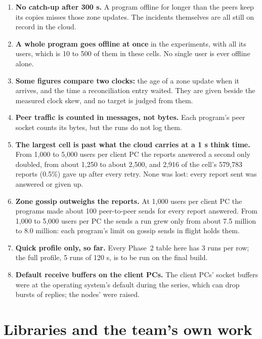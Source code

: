 \begin{enumerate}
  \item \textbf{No catch-up after 300 s.} A program offline for longer than the peers keep its copies misses those zone updates. The incidents themselves are all still on record in the cloud. %
  \item \textbf{A whole program goes offline at once} in the experiments, with all its users, which is 10 to 500 of them in these cells. No single user is ever offline alone. %
  \item \textbf{Some figures compare two clocks:} the age of a zone update when it arrives, and the time a reconciliation entry waited. They are given beside the measured clock skew, and no target is judged from them. %
  \item \textbf{Peer traffic is counted in messages, not bytes.} Each program's peer socket counts its bytes, but the runs do not log them. %
  \item \textbf{The largest cell is past what the cloud carries at a 1 s think time.} From 1,000 to 5,000 users per client PC the reports answered a second only doubled, from about 1,250 to about 2,500, and 2,916 of the cell's 579,783 reports (0.5\%) gave up after every retry. None was lost: every report sent was answered or given up.
  \item \textbf{Zone gossip outweighs the reports.} At 1,000 users per client PC the programs made about 100 peer-to-peer sends for every report answered. From 1,000 to 5,000 users per PC the sends a run grew only from about 7.5 million to 8.0 million: each program's limit on gossip sends in flight holds them.
  \item \textbf{Quick profile only, so far.} Every Phase~2 table here has 3 runs per row; the full profile, 5 runs of 120 s, is to be run on the final build.
  \item \textbf{Default receive buffers on the client PCs.} The client PCs' socket buffers were at the operating system's default during the series, which can drop bursts of replies; the nodes' were raised.
\end{enumerate}

\section{Libraries and the team's own work}
\label{sec:library}

